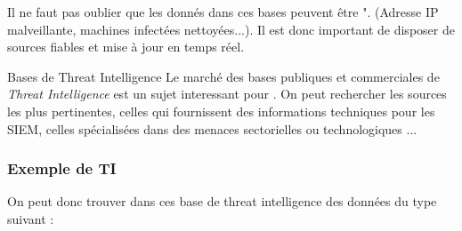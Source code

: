 Il ne faut pas oublier que les donnés dans ces bases peuvent être  ". (Adresse IP malveillante, machines infectées nettoyées...). Il est donc important de disposer de sources fiables et mise à jour en temps réel.

\begin{techworkbox}{Bases de Threat Intelligence}
Le marché des bases publiques et commerciales de \textit{Threat Intelligence} est un sujet interessant pour \fichetech. On peut rechercher les sources les plus pertinentes, celles qui fournissent des informations techniques pour les SIEM, celles spécialisées dans des menaces sectorielles ou technologiques ...
\end{techworkbox}


\subsubsection{Exemple de TI}

On peut donc trouver dans ces base de threat intelligence des données du type suivant  :

